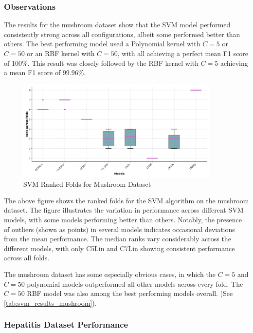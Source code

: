 \subsubsection*{Observations}
The results for the mushroom dataset show that the SVM model performed consistently strong across all configurations,
albeit some performed better than others. The best performing model used a Polynomial kernel with $C=5$ or $C=50$
or an RBF kernel with $C=50$, with all achieving a perfect mean F1 score of 100\%.
This result was closely followed by the RBF kernel with $C=5$ achieving a mean F1 score of 99.96\%.

\begin{figure}
    \centering
    \includegraphics[width=0.9\textwidth]{figures/ranked_folds_SVM_mushroom.png}
    \caption{SVM Ranked Folds for Mushroom Dataset}
    \label{fig:ranked_folds_SVM_mushroom}
\end{figure}

The above figure shows the ranked folds for the SVM algorithm on the mushroom dataset.
The figure illustrates the variation in performance across different SVM models, with some models performing 
better than others. Notably, the presence of outliers (shown as points) in several models indicates
occasional deviations from the mean performance. The median ranks vary considerably across the different models,
with only C5Lin and C7Lin showing consistent performance across all folds.

The mushroom dataset has some especially obvious cases, in which the $C=5$ and $C=50$ polynomial models
outperformed all other models across every fold. The $C=50$ RBF model was also among the best performing models overall. (See \autoref{tab:svm_results_mushroom}).

\subsubsection{Hepatitis Dataset Performance}

